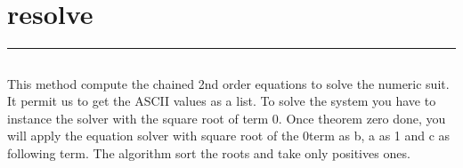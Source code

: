 \documentclass[letterpaper,10pt,english]{sphinxmanual}
\begin{document}
\subsection{}
\label{\detokenize{miamv3:source-code}}
\begin{sphinxVerbatim}[commandchars=\\\{\}]
\PYG{p}{[}\PYG{p}{]}
   
   
        \PYG{p}{[}\PYG{p}{]}\PYG{p}{[}\PYG{p}{]}
 
\end{sphinxVerbatim}

\newpage
\section{resolve}
\label{\detokenize{resolvev3:resolve}}\label{\detokenize{resolvev3::doc}}
\begin{sphinxVerbatim}[commandchars=\\\{\}]
 
\end{sphinxVerbatim}


\bigskip\hrule\bigskip



\subsection{}
\label{\detokenize{resolvev3:algorithm}}
\sphinxAtStartPar
This method compute the chained 2nd order equations to solve the numeric suit.
It permit us to get the ASCII values as a list.
To solve the system you have to instance the solver with the square root of term 0.
Once theorem zero done, you will apply the equation solver with square root of the 0\sphinxhyphen{}term as b,
a as 1 and c as \sphinxhyphen{}following term.
The algorithm sort the roots and take only positives ones.
\end{document}
